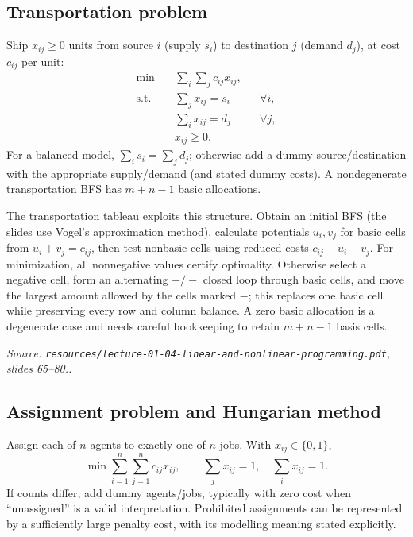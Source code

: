 \documentclass[11pt,a4paper]{article}
\renewcommand{\texttt}[1]{\nolinkurl{#1}}
\newcommand{\source}[1]{\par\smallskip\noindent\textit{Source: #1.}\par\smallskip}
\begin{document}
\subsection{Transportation problem}
Ship $x_{ij}\geq0$ units from source $i$ (supply $s_i$) to destination $j$ (demand $d_j$), at cost $c_{ij}$ per unit:
\begin{align*}
 \min\quad&\sum_i\sum_j c_{ij}x_{ij},\\
 \text{s.t.}\quad&\sum_jx_{ij}=s_i&&\forall i,\\
 &\sum_ix_{ij}=d_j&&\forall j,\\
 &x_{ij}\geq0.
\end{align*}
For a balanced model, $\sum_i s_i=\sum_jd_j$; otherwise add a dummy source/destination with the appropriate supply/demand (and stated dummy costs). A nondegenerate transportation BFS has $m+n-1$ basic allocations.

The transportation tableau exploits this structure. Obtain an initial BFS (the slides use Vogel's approximation method), calculate potentials $u_i,v_j$ for basic cells from $u_i+v_j=c_{ij}$, then test nonbasic cells using reduced costs $c_{ij}-u_i-v_j$. For minimization, all nonnegative values certify optimality. Otherwise select a negative cell, form an alternating $+/-$ closed loop through basic cells, and move the largest amount allowed by the cells marked $-$; this replaces one basic cell while preserving every row and column balance. A zero basic allocation is a degenerate case and needs careful bookkeeping to retain $m+n-1$ basis cells.
\source{\texttt{resources/lecture-01-04-linear-and-nonlinear-programming.pdf}, slides 65--80.}

\subsection{Assignment problem and Hungarian method}
Assign each of $n$ agents to exactly one of $n$ jobs. With $x_{ij}\in\{0,1\}$,
\[
 \min\sum_{i=1}^n\sum_{j=1}^n c_{ij}x_{ij},\qquad
 \sum_jx_{ij}=1,\quad\sum_ix_{ij}=1.
\]
If counts differ, add dummy agents/jobs, typically with zero cost when ``unassigned'' is a valid interpretation. Prohibited assignments can be represented by a sufficiently large penalty cost, with its modelling meaning stated explicitly.
\end{document}
